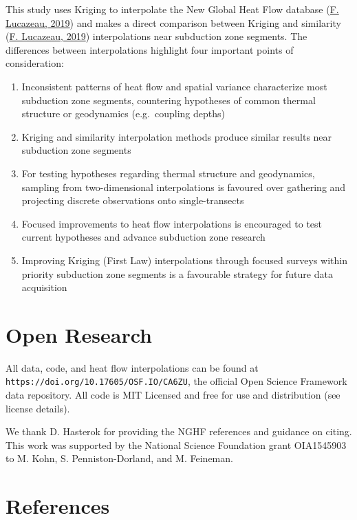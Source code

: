 \documentclass[draft,linenumbers]{agujournal2018}
\begin{document}
This study uses Kriging to interpolate the New Global Heat Flow database
(\protect\hyperlink{ref-lucazeau2019}{F. Lucazeau, 2019}) and makes a
direct comparison between Kriging and similarity
(\protect\hyperlink{ref-lucazeau2019}{F. Lucazeau, 2019}) interpolations
near subduction zone segments. The differences between interpolations
highlight four important points of consideration:

\begin{enumerate}
\def\labelenumi{\arabic{enumi}.}
\item
  Inconsistent patterns of heat flow and spatial variance characterize
  most subduction zone segments, countering hypotheses of common thermal
  structure or geodynamics (e.g.~coupling depths)
\item
  Kriging and similarity interpolation methods produce similar results
  near subduction zone segments
\item
  For testing hypotheses regarding thermal structure and geodynamics,
  sampling from two-dimensional interpolations is favoured over
  gathering and projecting discrete observations onto single-transects
\item
  Focused improvements to heat flow interpolations is encouraged to test
  current hypotheses and advance subduction zone research
\item
  Improving Kriging (First Law) interpolations through focused surveys
  within priority subduction zone segments is a favourable strategy for
  future data acquisition
\end{enumerate}

\section{Open Research}

All data, code, and heat flow interpolations can be found at
\texttt{https://doi.org/10.17605/OSF.IO/CA6ZU}, the official Open
Science Framework data repository. All code is MIT Licensed and free for
use and distribution (see license details).

\clearpage

\acknowledgments

We thank D. Hasterok for providing the NGHF references and guidance on
citing. This work was supported by the National Science Foundation grant
OIA1545903 to M. Kohn, S. Penniston-Dorland, and M. Feineman.

\section{References}
\end{document}
